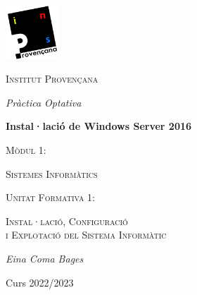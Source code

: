 \begin{titlepage}
	\centering
	\includegraphics*[width=0.15\textwidth]{provencana_color.pdf}
	\par\vspace{0.5cm}

	{\scshape\Large Institut Provençana \par}

	\vspace{1cm}
	
	{\itshape\Large Pràctica Optativa \par}
	{\bfseries\LARGE Instal·lació de Windows Server 2016 \par}
	
	\vspace{1cm}

	{\scshape\large Mòdul 1: \par}
	{\scshape\Large Sistemes Informàtics \par}

	\vspace{0.5cm}
	
	{\scshape\normalsize Unitat Formativa 1: \par}
	{\scshape\large Instal·lació, Configuració \\ i Explotació del Sistema Informàtic\par}

	\vfill
	{\Large\itshape Eina Coma Bages\par}
	
	\vfill
	Curs 2022/2023
\end{titlepage}